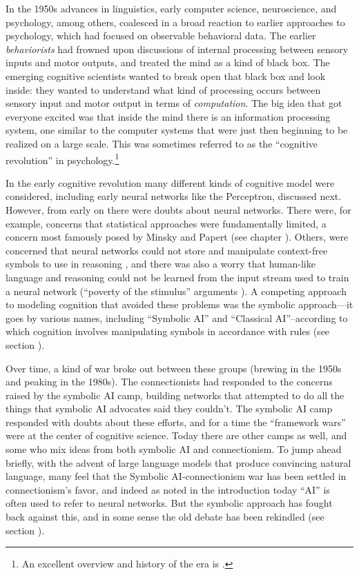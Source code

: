In the 1950s advances in linguistics, early computer science, neuroscience, and psychology, among others, coalesced in a broad reaction to earlier approaches to psychology, which had focused on observable behavioral data. The earlier \emph{behaviorists} had frowned upon discussions of internal processing between sensory inputs and motor outputs, and treated the mind as a kind of black box. The emerging cognitive scientists wanted to break open that black box and look inside: they wanted to understand what kind of processing occurs between sensory input and motor output in terms of \emph{computation}. The big idea that got everyone excited was that inside the mind there is an information processing system, one similar to the computer systems that were just then beginning to be realized on a large scale. This was sometimes referred to as the ``cognitive revolution'' in psychology.\footnote{An excellent overview and history of the era is \cite{baars1986cognitive}.}  

In the early cognitive revolution many different kinds of cognitive model were considered, including early neural networks like the Perceptron, discussed next. However, from early on there were doubts about neural networks. There were, for example, concerns that statistical approaches were fundamentally limited, a concern most famously posed by Minsky and Papert (see chapter ). Others, were concerned that neural networks could not store and manipulate context-free symbols to use in reasoning \cite{fodor1988connectionism}, and there was also a worry that human-like language and reasoning could not be learned from the input stream used to train a neural network (``poverty of the stimulus'' arguments \cite{berwick2011poverty}). A competing approach to modeling cognition that avoided these problems was the symbolic approach---it goes by various names, including ``Symbolic AI'' and ``Classical AI''--according to which cognition involves manipulating symbols in accordance with rules (see section ). 

Over time, a kind of war broke out between these groups (brewing in the 1950s and peaking in the 1980s).  The connectionists had responded to the concerns raised by the symbolic AI camp, building networks that attempted to do all the things that symbolic AI advocates said they couldn't. The symbolic AI camp responded with doubts about these efforts, and for a time the ``framework wars'' were at the center of cognitive science. Today there are other camps as well, and some who mix ideas from both symbolic AI and connectionism. To jump ahead briefly, with the advent of large language models that produce convincing natural language, many feel that the Symbolic AI-connectionism war has been settled in connectionism's favor, and indeed  as noted in the introduction today ``AI'' is often used to refer to neural networks. But the symbolic approach has fought back against this, and in some sense the old debate has been rekindled (see section ).

